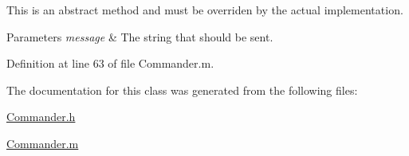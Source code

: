 This is an abstract method and must be overriden by the actual implementation.


\begin{DoxyParams}{Parameters}
{\em message} & The string that should be sent. \\
\hline
\end{DoxyParams}


Definition at line 63 of file Commander.m.



The documentation for this class was generated from the following files:\begin{DoxyCompactItemize}
\item 
\hyperlink{_commander_8h}{Commander.h}\item 
\hyperlink{_commander_8m}{Commander.m}\end{DoxyCompactItemize}

